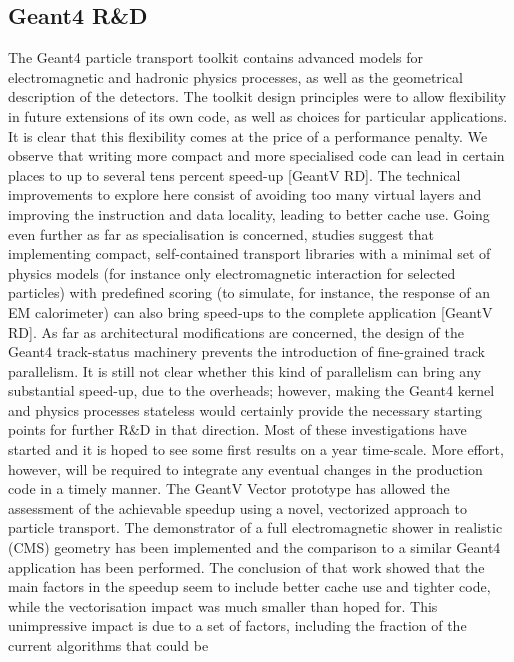 \documentclass[10pt,a4paper]{article}
\begin{document}
\hypertarget{geant4-rd}{%
\subsection{Geant4 R\&D}\label{geant4-rd}}

The Geant4 particle transport toolkit contains advanced models for
electromagnetic and hadronic physics processes, as well as the
geometrical description of the detectors. The toolkit design principles
were to allow flexibility in future extensions of its own code, as well
as choices for particular applications. It is clear that this
flexibility comes at the price of a performance penalty. We observe that
writing more compact and more specialised code can lead in certain
places to up to several tens percent speed-up {[}GeantV RD{]}. The
technical improvements to explore here consist of avoiding too many
virtual layers and improving the instruction and data locality, leading
to better cache use. Going even further as far as specialisation is
concerned, studies suggest that implementing compact, self-contained
transport libraries with a minimal set of physics models (for instance
only electromagnetic interaction for selected particles) with predefined
scoring (to simulate, for instance, the response of an EM calorimeter)
can also bring speed-ups to the complete application {[}GeantV RD{]}. As
far as architectural modifications are concerned, the design of the
Geant4 track-status machinery prevents the introduction of fine-grained
track parallelism. It is still not clear whether this kind of
parallelism can bring any substantial speed-up, due to the overheads;
however, making the Geant4 kernel and physics processes stateless would
certainly provide the necessary starting points for further R\&D in that
direction. Most of these investigations have started and it is hoped to
see some first results on a year time-scale. More effort, however, will
be required to integrate any eventual changes in the production code in
a timely manner. The GeantV Vector prototype has allowed the assessment
of the achievable speedup using a novel, vectorized approach to particle
transport. The demonstrator of a full electromagnetic shower in
realistic (CMS) geometry has been implemented and the comparison to a
similar Geant4 application has been performed. The conclusion of that
work showed that the main factors in the speedup seem to include better
cache use and tighter code, while the vectorisation impact was much
smaller than hoped for. This unimpressive impact is due to a set of
factors, including the fraction of the current algorithms that could be
\end{document}
